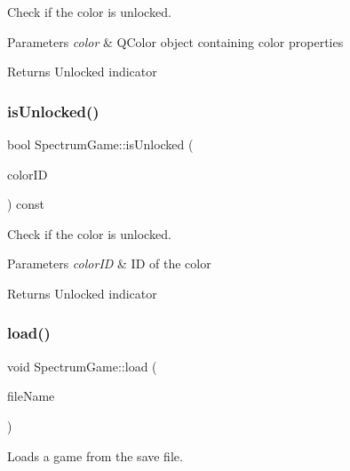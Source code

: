 Check if the color is unlocked. 


\begin{DoxyParams}{Parameters}
{\em color} & Q\+Color object containing color properties \\
\hline
\end{DoxyParams}
\begin{DoxyReturn}{Returns}
Unlocked indicator 
\end{DoxyReturn}
\mbox{\label{class_spectrum_game_a36ec9500dcbb54607fdd667c2ee796ed}} 
\subsubsection{\texorpdfstring{is\+Unlocked()}{isUnlocked()}\hspace{0.1cm}{\footnotesize\ttfamily [2/2]}}
{\footnotesize\ttfamily bool Spectrum\+Game\+::is\+Unlocked (\begin{DoxyParamCaption}\item[{int}]{color\+ID }\end{DoxyParamCaption}) const}



Check if the color is unlocked. 


\begin{DoxyParams}{Parameters}
{\em color\+ID} & ID of the color \\
\hline
\end{DoxyParams}
\begin{DoxyReturn}{Returns}
Unlocked indicator 
\end{DoxyReturn}
\mbox{\label{class_spectrum_game_a46b514f657f13b2c4fa20402a4e44c72}} 
\subsubsection{\texorpdfstring{load()}{load()}}
{\footnotesize\ttfamily void Spectrum\+Game\+::load (\begin{DoxyParamCaption}\item[{Q\+String \&}]{file\+Name }\end{DoxyParamCaption})}



Loads a game from the save file. 


